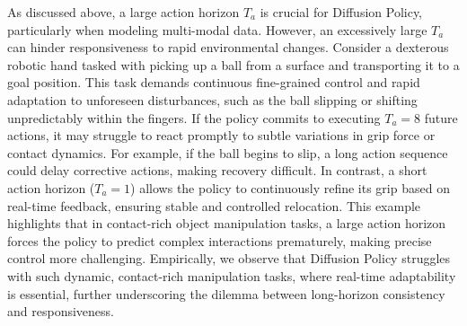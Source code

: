 As discussed above, a large action horizon \( T_a \) is crucial for Diffusion Policy, particularly when modeling multi-modal data. However, an excessively large \( T_a \) can hinder responsiveness to rapid environmental changes. Consider a dexterous robotic hand tasked with picking up a ball from a surface and transporting it to a goal position. This task demands continuous fine-grained control and rapid adaptation to unforeseen disturbances, such as the ball slipping or shifting unpredictably within the fingers. If the policy commits to executing \( T_a = 8 \) future actions, it may struggle to react promptly to subtle variations in grip force or contact dynamics. For example, if the ball begins to slip, a long action sequence could delay corrective actions, making recovery difficult. In contrast, a short action horizon (\( T_a = 1 \)) allows the policy to continuously refine its grip based on real-time feedback, ensuring stable and controlled relocation. This example highlights that in contact-rich object manipulation tasks, a large action horizon forces the policy to predict complex interactions prematurely, making precise control more challenging. Empirically, we observe that Diffusion Policy struggles with such dynamic, contact-rich manipulation tasks, where real-time adaptability is essential, further underscoring the dilemma between long-horizon consistency and responsiveness.


